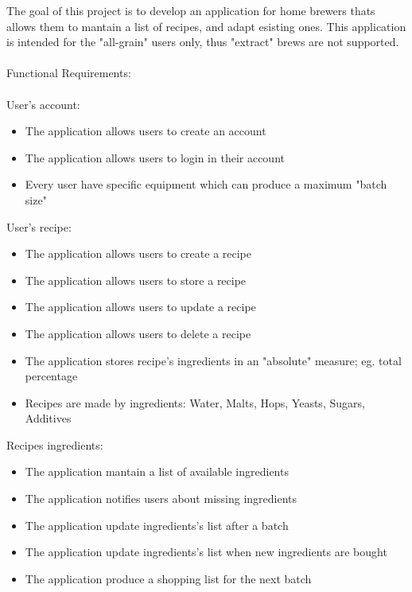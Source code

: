\documentclass[12pt]{article}
\begin{document}
The goal of this project is to develop an application for home brewers thats allows them to mantain a list of recipes, and adapt esisting ones.
This application is intended for the "all-grain" users only, thus "extract" brews are not supported. \\
\\
Functional Requirements:\\
\\
User's account:
\begin{itemize}
\item The application allows users to create an account

\item The application allows users to login in their account

\item Every user have specific equipment which can produce a maximum "batch size"\\
\end{itemize}
User's recipe:
\begin{itemize}
\item The application allows users to create a recipe

\item The application allows users to store a recipe 

\item The application allows users to update a recipe

\item The application allows users to delete a recipe

\item The application stores recipe's ingredients in an "absolute" measure; eg. total percentage

\item Recipes are made by ingredients: Water, Malts, Hops, Yeasts, Sugars, Additives
\end{itemize}
\newpage
Recipes ingredients:\\
\begin{itemize}
\item The application mantain a list of available ingredients

\item The application notifies users about missing ingredients

\item The application update ingredients's list after a batch

\item The application update ingredients's list when new ingredients are bought

\item The application produce a shopping list for the next batch \\
\end{itemize}
\end{document}
